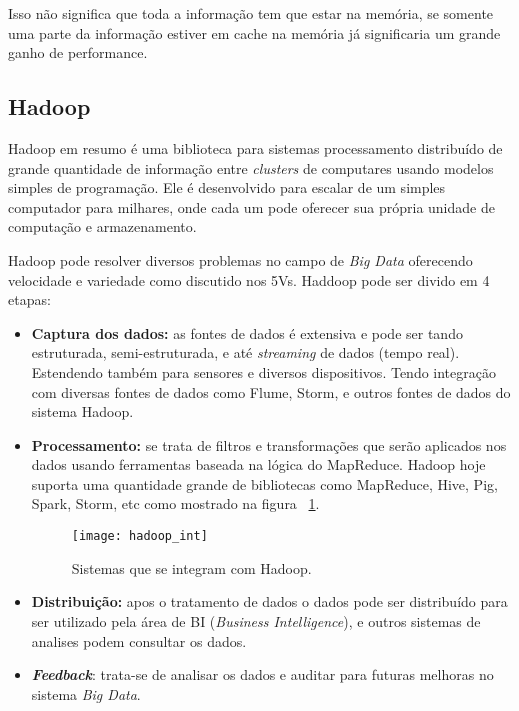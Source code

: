 Isso não significa que toda a informação tem que estar na memória, se somente uma parte da informação estiver em cache na memória já significaria um grande ganho de performance.~\cite{realtime}

\subsection{Hadoop}
Hadoop em resumo é uma biblioteca para sistemas processamento distribuído de grande quantidade de informação entre \textit{clusters} de computares usando modelos simples de programação. Ele é desenvolvido para escalar de um simples computador para milhares, onde cada um pode oferecer sua própria unidade de computação e armazenamento.~\cite{hadoop}

Hadoop pode resolver diversos problemas no campo de \textit{Big Data} oferecendo velocidade e variedade como discutido nos 5Vs. Haddoop pode ser divido em 4 etapas:~\cite{hadoopessentials}

\begin{itemize}
\item \textbf{Captura dos dados:} as fontes de dados é extensiva e pode ser tando estruturada, semi-estruturada, e até \textit{streaming} de dados (tempo real). Estendendo também para sensores e diversos dispositivos. Tendo integração com diversas fontes de dados como Flume, Storm, e outros fontes de dados do sistema Hadoop.

\item \textbf{Processamento:} se trata de filtros e transformações que serão aplicados  nos dados usando ferramentas baseada na lógica do MapReduce. Hadoop hoje suporta uma quantidade grande de bibliotecas como MapReduce, Hive, Pig, Spark, Storm, etc como mostrado na figura ~\ref{fig:hadoopint}.
	
\begin{figure}[!h]
		\caption{\label{fig:hadoopint} Sistemas que se integram com Hadoop.}
		\begin{center}
			\texttt{[image: hadoop\_int]}
		\end{center}
\end{figure}

\item \textbf{Distribuição:} apos o tratamento de dados o dados pode ser distribuído para ser utilizado pela área de BI (\textit{Business Intelligence}), e outros sistemas de analises podem consultar os dados.
	
\item \textbf{\textit{Feedback}}: trata-se de analisar os dados e auditar para futuras melhoras no sistema \textit{Big Data}.
\end{itemize}


